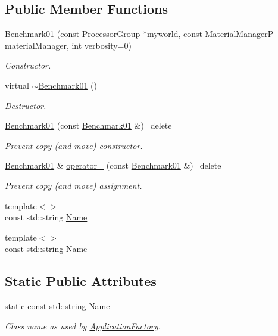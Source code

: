 \subsection*{Public Member Functions}
\begin{DoxyCompactItemize}
\item 
\hyperlink{classUintah_1_1PhaseField_1_1Benchmark01_a1081aa4dc4f203dda68637071b5a86b1}{Benchmark01} (const Processor\+Group $\ast$myworld, const Material\+ManagerP material\+Manager, int verbosity=0)
\begin{DoxyCompactList}\small\item\em Constructor. \end{DoxyCompactList}\item 
virtual \hyperlink{classUintah_1_1PhaseField_1_1Benchmark01_a9515dd5a93049aadddcdfe50bd8b73fd}{$\sim$\+Benchmark01} ()
\begin{DoxyCompactList}\small\item\em Destructor. \end{DoxyCompactList}\item 
\hyperlink{classUintah_1_1PhaseField_1_1Benchmark01_a15134f872f3a9060c920f4dce5efc8b6}{Benchmark01} (const \hyperlink{classUintah_1_1PhaseField_1_1Benchmark01}{Benchmark01} \&)=delete
\begin{DoxyCompactList}\small\item\em Prevent copy (and move) constructor. \end{DoxyCompactList}\item 
\hyperlink{classUintah_1_1PhaseField_1_1Benchmark01}{Benchmark01} \& \hyperlink{classUintah_1_1PhaseField_1_1Benchmark01_a78557f576ba2deb68ef0715766bb6f77}{operator=} (const \hyperlink{classUintah_1_1PhaseField_1_1Benchmark01}{Benchmark01} \&)=delete
\begin{DoxyCompactList}\small\item\em Prevent copy (and move) assignment. \end{DoxyCompactList}\item 
{\footnotesize template$<$$>$ }\\const std\+::string \hyperlink{classUintah_1_1PhaseField_1_1Benchmark01_a798873872d0207da600c4b037a952478}{Name}
\item 
{\footnotesize template$<$$>$ }\\const std\+::string \hyperlink{classUintah_1_1PhaseField_1_1Benchmark01_a87c90fb809d6afa3f37b29f6fffd62f3}{Name}
\end{DoxyCompactItemize}
\subsection*{Static Public Attributes}
\begin{DoxyCompactItemize}
\item 
static const std\+::string \hyperlink{classUintah_1_1PhaseField_1_1Benchmark01_abab90c495929691edf1c71d2a596c9b2}{Name}
\begin{DoxyCompactList}\small\item\em Class name as used by \hyperlink{classUintah_1_1PhaseField_1_1ApplicationFactory}{Application\+Factory}. \end{DoxyCompactList}\end{DoxyCompactItemize}
